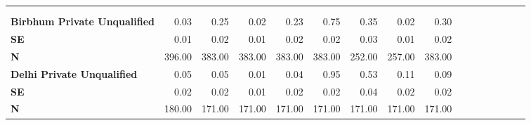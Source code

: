 \begin{tabular}{@{\extracolsep{5pt}}lrrrrrrrrrrrrrrr}
\toprule
&  &  &  &  &  &  &  &  \\
{\bf } &  &  &  &  &  &  &  &  \\
\hline
{\bf Birbhum Private Unqualified} & 0.03\phantom{***} & 0.25\phantom{***} & 0.02\phantom{***} & 0.23\phantom{***} & 0.75\phantom{***} & 0.35\phantom{***} & 0.02\phantom{***} & 0.30\phantom{***} \\
{\bf SE} & 0.01\phantom{***} & 0.02\phantom{***} & 0.01\phantom{***} & 0.02\phantom{***} & 0.02\phantom{***} & 0.03\phantom{***} & 0.01\phantom{***} & 0.02\phantom{***} \\
{\bf N} & 396.00\phantom{***} & 383.00\phantom{***} & 383.00\phantom{***} & 383.00\phantom{***} & 383.00\phantom{***} & 252.00\phantom{***} & 257.00\phantom{***} & 383.00\phantom{***} \\
{\bf Delhi Private Unqualified} & 0.05\phantom{***} & 0.05\phantom{***} & 0.01\phantom{***} & 0.04\phantom{***} & 0.95\phantom{***} & 0.53\phantom{***} & 0.11\phantom{***} & 0.09\phantom{***} \\
{\bf SE} & 0.02\phantom{***} & 0.02\phantom{***} & 0.01\phantom{***} & 0.02\phantom{***} & 0.02\phantom{***} & 0.04\phantom{***} & 0.02\phantom{***} & 0.02\phantom{***} \\
{\bf N} & 180.00\phantom{***} & 171.00\phantom{***} & 171.00\phantom{***} & 171.00\phantom{***} & 171.00\phantom{***} & 171.00\phantom{***} & 171.00\phantom{***} & 171.00\phantom{***} \\

\end{tabular}
